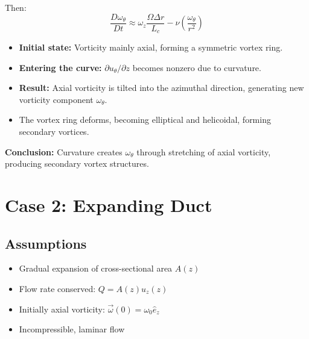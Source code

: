 \documentclass{article}
\begin{document}
Then:
\begin{equation}
    \frac{D\omega_\theta}{Dt} \approx \omega_z \frac{\Omega \Delta r}{L_c} - \nu \left(\frac{\omega_\theta}{r^2}\right)
\end{equation}

\begin{itemize}
    \item \textbf{Initial state:} Vorticity mainly axial, forming a symmetric vortex ring.
    \item \textbf{Entering the curve:} $\partial u_\theta/\partial z$ becomes nonzero due to curvature.
    \item \textbf{Result:} Axial vorticity is tilted into the azimuthal direction, generating new vorticity component $\omega_\theta$.
    \item The vortex ring deforms, becoming elliptical and helicoidal, forming secondary vortices.
\end{itemize}

\textbf{Conclusion:} Curvature creates $\omega_\theta$ through stretching of axial vorticity, producing secondary vortex structures.

\section{Case 2: Expanding Duct}

\subsection{Assumptions}

\begin{center}
\end{center}

\begin{itemize}
    \item Gradual expansion of cross-sectional area $A(z)$
    \item Flow rate conserved: $Q = A(z)u_z(z)$
    \item Initially axial vorticity: $\vec{\omega}(0) = \omega_0 \hat{e}_z$
    \item Incompressible, laminar flow
\end{itemize}
\end{document}
